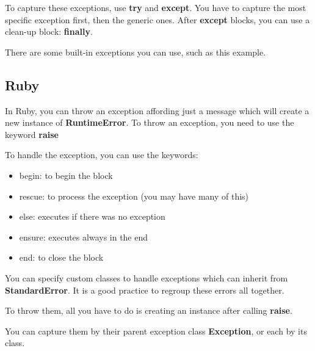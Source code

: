 \documentclass{KodeBook}
\begin{document}
To capture these exceptions, use \textbf{try} and \textbf{except}. 
You have to capture the most specific exception first, then the generic ones. 
After \textbf{except} blocks, you can use a clean-up block: \textbf{finally}.



There are some built-in exceptions you can use, such as this example.



\subsection{Ruby}

In Ruby, you can throw an exception affording just a message which will create a new instance of \textbf{RuntimeError}. 
To throw an exception, you need to use the keyword \textbf{raise}



To handle the exception, you can use the keywords: 
\begin{itemize}
	\item begin: to begin the block
	\item rescue: to process the exception (you may have many of this)
	\item else: executes if there was no exception
	\item ensure: executes always in the end
	\item end: to close the block
\end{itemize}



You can specify custom classes to handle exceptions which can inherit from \textbf{StandardError}. 
It is a good practice to regroup these errors all together.



To throw them, all you have to do is creating an instance after calling \textbf{raise}.



You can capture them by their parent exception class \textbf{Exception}, or each by its class.




\ifx\wholebook\relax\else
% 
% 
	
\end{document}
